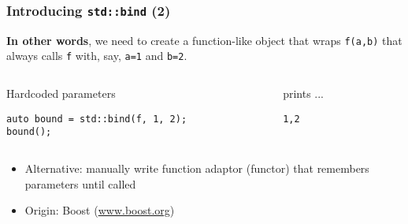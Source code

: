 \begin{frame}[fragile]
  \frametitle{Introducing \texttt{std::bind} (2)}

  \textbf{In other words}, we need to create a function-like object
  that wraps \texttt{f(a,b)} that always calls \texttt{f} with, say,
  \texttt{a=1} and \texttt{b=2}.

  \begin{columns}[t]

    \begin{column}{.6\textwidth}
      \begin{block}{Hardcoded parameters}
\begin{verbatim}
auto bound = std::bind(f, 1, 2);
bound();
\end{verbatim}
      \end{block}
    \end{column}

    \begin{column}{.3\textwidth}
      \begin{block}{prints ...}
\begin{verbatim}
1,2
\end{verbatim}
      \end{block}
    \end{column}

  \end{columns}

  \begin{itemize}
  \item Alternative: manually write function adaptor (functor) that
    remembers parameters until called
  \item Origin: Boost (\href{www.boost.org}{www.boost.org})
  \end{itemize}

\end{frame}

